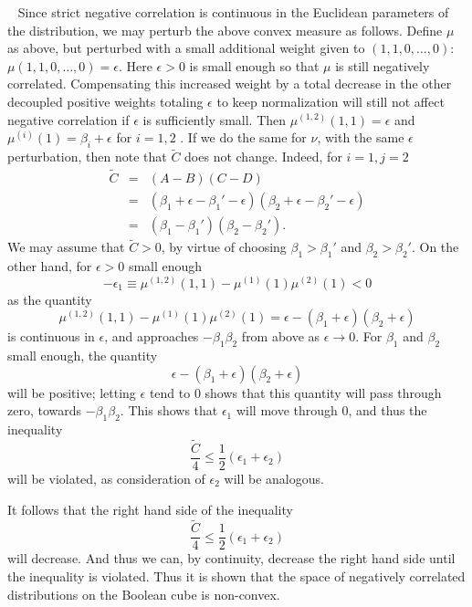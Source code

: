 \documentclass[11pt]{article}
\newenvironment{Proof}{\noindent{\bf Proof} \ }{\QED}\smallskip
\newcommand\QED{\newline \rightline{$\blacksquare$} \bigskip}
\begin{document}
\begin{Proof}
Since strict negative correlation is continuous in the Euclidean parameters of the distribution, we may perturb the above convex measure as follows. Define $\mu$ as above, but perturbed with a small additional weight given to $(1,1,0,\dots, 0)$: $\mu(1,1,0,\dots, 0) = \epsilon$. Here $\epsilon>0$ is small enough so that $\mu$ is still negatively correlated.  
Compensating this increased weight by a total decrease in the other decoupled positive weights totaling $\epsilon$ to keep normalization will still not affect negative correlation if $\epsilon$ is sufficiently small.
Then $\mu^{(1,2)}(1,1) = \epsilon$ and $\mu^{(i)}(1) = \beta_i+\epsilon$ for $i=1,2$ . If we do the same for $\nu$, with the same $\epsilon$ perturbation, then note that $\tilde{C}$ does not change. Indeed, for $i=1, j=2$ 
\begin{eqnarray*}
    \tilde{C} &=& (A-B)(C-D) \\
    &=& (\beta_1+\epsilon-\beta_1'-\epsilon)(\beta_2+\epsilon -\beta_2'-\epsilon)\\
    &=&(\beta_1-\beta_1')(\beta_2-\beta_2').
    \end{eqnarray*}
We may assume that $\tilde{C}>0$, by virtue of choosing $\beta_1>\beta_1'$ and $\beta_2>\beta_2'$.
On the other hand, for $\epsilon>0$ small enough
\[
 -\epsilon_1 \equiv \mu^{(1,2)}(1,1) -\mu^{(1)}(1)\mu^{(2)}(1) <0
\]
as the quantity 
\[
\mu^{(1,2)}(1,1) -\mu^{(1)}(1)\mu^{(2)}(1) =\epsilon-(\beta_1+\epsilon)(\beta_2+\epsilon)
\]
is continuous in $\epsilon$, and approaches $-\beta_1\beta_2$ from above as $\epsilon\to 0$. For $\beta_1$ and $\beta_2$ small enough, the quantity 
\[
\epsilon-(\beta_1+\epsilon)(\beta_2+\epsilon)
\]
will be positive; letting $\epsilon$ tend to 0 shows that this quantity will pass through zero, towards $-\beta_1\beta_2$. This shows that $\epsilon_1$ will move through 0, and thus the inequality 
\[
\frac{\tilde{C}}{4} \leq \frac{1}{2}(\epsilon_1+\epsilon_2)
\]
will be violated, as consideration of $\epsilon_2$ will be analogous. 



It follows that the right hand side of the inequality 
\[
\frac{\tilde{C}}{4} \leq \frac{1}{2}(\epsilon_1+\epsilon_2)
\]
will decrease. And thus we can, by continuity, decrease the right hand side until the inequality is violated. Thus it is shown that the space of negatively correlated distributions on the Boolean cube is non-convex.
\end{Proof}
\end{document}
